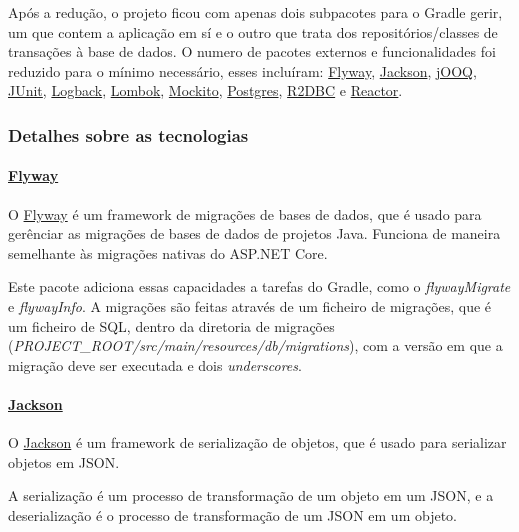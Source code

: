 Após a redução, o projeto ficou com apenas dois subpacotes para o Gradle gerir, um que contem a aplicação em sí e o outro que trata dos repositórios/classes de transações à base de dados. O numero de pacotes externos e funcionalidades foi reduzido para o mínimo necessário, esses incluíram: \href{https://flywaydb.org/}{Flyway}, \href{http://fasterxml.com/}{Jackson}, \href{https://www.jooq.org/}{jOOQ}, \href{https://junit.org/junit5/}{JUnit}, \href{https://logback.qos.ch/}{Logback}, \href{https://projectlombok.org/}{Lombok}, \href{https://site.mockito.org/}{Mockito}, \href{https://jdbc.postgresql.org/}{Postgres}, \href{https://r2dbc.io/}{R2DBC} e \href{https://projectreactor.io/}{Reactor}.

\newpage

\subsubsection{Detalhes sobre as tecnologias}

\paragraph{\href{https://flywaydb.org/}{Flyway}\\}

O \href{https://flywaydb.org/}{Flyway} é um framework de migrações de bases de dados, que é usado para gerênciar as migrações de bases de dados de projetos Java. Funciona de maneira semelhante às migrações nativas do ASP.NET Core.

Este pacote adiciona essas capacidades a tarefas do Gradle, como o \textit{flywayMigrate} e \textit{flywayInfo}. A migrações são feitas através de um ficheiro de migrações, que é um ficheiro de SQL, dentro da diretoria de migrações (\textit{PROJECT\_ROOT/src/main/resources/db/migrations}), com a versão em que a migração deve ser executada e dois \textit{underscores}.

\paragraph{\href{http://fasterxml.com/}{Jackson}\\}

O \href{http://fasterxml.com/}{Jackson} é um framework de serialização de objetos, que é usado para serializar objetos em JSON.

A serialização é um processo de transformação de um objeto em um JSON, e a deserialização é o processo de transformação de um JSON em um objeto.

